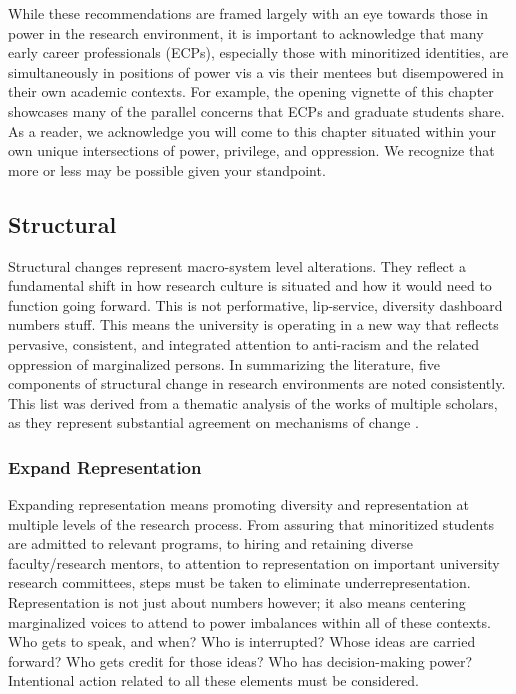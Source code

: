 \documentclass[
  11pt,
]{book}
\begin{document}
While these recommendations are framed largely with an eye towards those in power in the research environment, it is important to acknowledge that many early career professionals (ECPs), especially those with minoritized identities, are simultaneously in positions of power vis a vis their mentees but disempowered in their own academic contexts. For example, the opening vignette of this chapter showcases many of the parallel concerns that ECPs and graduate students share. As a reader, we acknowledge you will come to this chapter situated within your own unique intersections of power, privilege, and oppression. We recognize that more or less may be possible given your standpoint.

\subsection{Structural}\label{structural}

Structural changes represent macro-system level alterations. They reflect a fundamental shift in how research culture is situated and how it would need to function going forward. This is not performative, lip-service, diversity dashboard numbers stuff. This means the university is operating in a new way that reflects pervasive, consistent, and integrated attention to anti-racism and the related oppression of marginalized persons. In summarizing the literature, five components of structural change in research environments are noted consistently. This list was derived from a thematic analysis of the works of multiple scholars, as they represent substantial agreement on mechanisms of change \citep{ajjawi_what_2018, galan_editorial_2021, haeger_creating_2021, kent_recommendations_2022, kis_leaving_2022, cirillo-mccarthy_developing_2022, perez-lopez_ten_2022, posselt_rigor_2018, talusan_identity-conscious_2022, tung_making_2023, watkins_engaging_2018}.

\subsubsection{Expand Representation}\label{expand-representation}

Expanding representation means promoting diversity and representation at multiple levels of the research process\citep{haeger_creating_2021, perez-lopez_ten_2022, watkins_engaging_2018}. From assuring that minoritized students are admitted to relevant programs, to hiring and retaining diverse faculty/research mentors, to attention to representation on important university research committees, steps must be taken to eliminate underrepresentation. Representation is not just about numbers however; it also means centering marginalized voices to attend to power imbalances within all of these contexts. Who gets to speak, and when? Who is interrupted? Whose ideas are carried forward? Who gets credit for those ideas? Who has decision-making power? Intentional action related to all these elements must be considered.
\end{document}
